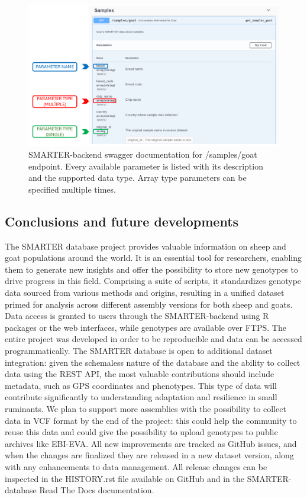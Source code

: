 \documentclass[a4paper,num-refs,gigabyte]{oup-contemporary}
\begin{document}
\begin{figure}
\centering
\includegraphics[width=.95\textwidth]{endpoints.png}
\caption{SMARTER-backend swagger documentation for /samples/goat endpoint. Every available parameter is listed
with its description and the supported data type. Array type parameters can be specified multiple times.}
\label{fig:endpoint}
\end{figure}

\subsection{Conclusions and future developments}
The SMARTER database project provides valuable information on sheep and goat populations around the world. It is an essential tool for researchers, enabling them to generate new insights and offer the possibility to store new genotypes to drive progress in this field. Comprising a suite of scripts, it standardizes genotype data sourced from various methods and origins, resulting in a unified dataset primed for analysis across different assembly versions for both sheep and goats. Data access is granted to users through the SMARTER-backend using R packages or the web interfaces, while genotypes are available over FTPS. The entire project was developed in order to be reproducible and data can be accessed programmatically.
The SMARTER database is open to additional dataset integration: given the schemaless nature of the database and the ability to collect data using the REST API, the most valuable contributions should include metadata, such as GPS coordinates and phenotypes. This type of data will contribute significantly to understanding adaptation and resilience in small ruminants.
We plan to support more assemblies with the possibility to collect data in VCF format by the end of the project: this could help the community to reuse this data and could give the possibility to upload genotypes to public archives like EBI-EVA.
All new improvements are tracked as GitHub issues\citep{SMARTERDB-GH-ISSUES}, and when the changes are finalized they are released in a new dataset version, along with any enhancements to data management. All release changes can be inspected in the HISTORY.rst\citep{SMARTERDB-GH-HISTORY} file available on GitHub and in the SMARTER-database Read The Docs documentation\citep{SMARTERdocs}.
\end{document}
